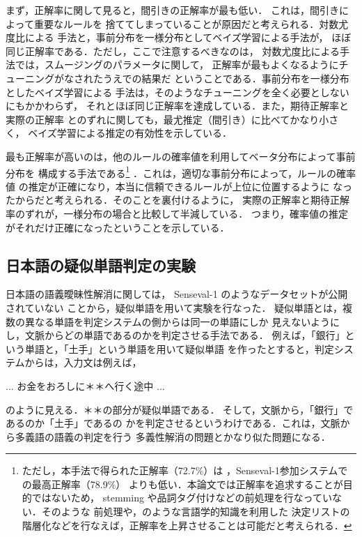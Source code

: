 まず，正解率に関して見ると，間引きの正解率が最も低い．
これは，間引きによって重要なルールを
捨ててしまっていることが原因だと考えられる．対数尤度比による
手法と，事前分布を一様分布としてベイズ学習による手法が，
ほぼ同じ正解率である．ただし，ここで注意するべきなのは，
対数尤度比による手法では，スムージングのパラメータに関して，
正解率が最もよくなるようにチューニングがなされたうえでの結果だ
ということである．事前分布を一様分布としたベイズ学習による
手法は，そのようなチューニングを全く必要としないにもかかわらず，
それとほぼ同じ正解率を達成している．また，期待正解率と実際の正解率
とのずれに関しても，最尤推定（間引き）に比べてかなり小さく，
ベイズ学習による推定の有効性を示している．

最も正解率が高いのは，他のルールの確率値を利用してベータ分布によって事前分布を
構成する手法である\footnote{ただし，本手法で得られた正解率（72.7\%）は
，Senseval-1参加システムでの最高正解率（78.9\%）\cite{Yarowsky:Hierarchical}
よりも低い．本論文では正解率を追求することが目的ではないため，
stemming や品詞タグ付けなどの前処理を行なっていない．そのような
前処理や，\cite{Yarowsky:Hierarchical}のような言語学的知識を利用した
決定リストの階層化などを行なえば，正解率を上昇させることは可能だと考えられる．
}
．これは，適切な事前分布によって，ルールの確率値
の推定が正確になり，本当に信頼できるルールが上位に位置するように
なったからだと考えられる．そのことを裏付けるように，
実際の正解率と期待正解率のずれが，一様分布の場合と比較して半減している．
つまり，確率値の推定がそれだけ正確になったということを示している．


\subsection{日本語の疑似単語判定の実験}

日本語の語義曖昧性解消に関しては，
Senseval-1 のようなデータセットが公開されていない
ことから，疑似単語を用いて実験を行なった．
疑似単語とは，複数の異なる単語を判定システムの側からは同一の単語にしか
見えないようにし，文脈からどの単語であるのかを判定させる手法である．
例えば，「銀行」という単語と，「土手」という単語を用いて疑似単語
を作ったとすると，判定システムからは，入力文は例えば，
\begin{center}
... お金をおろしに＊＊へ行く途中 ...
\end{center}
\noindent
のように見える．＊＊の部分が疑似単語である．
そして，文脈から，「銀行」であるのか「土手」であるの
かを判定させるというわけである．これは，文脈から多義語の語義の判定を行う
多義性解消の問題とかなり似た問題になる．

